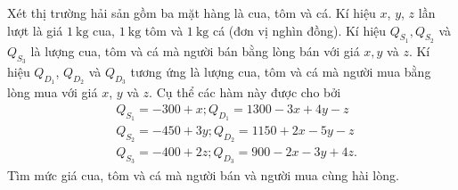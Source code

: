 \begin{bt}%
 Xét thị trường hải sản gồm ba mặt hàng là cua, tôm và cá. Kí hiệu $x$, $y$, $z$ lần lượt là giá $1 \mathrm{~kg}$ cua, $1 \mathrm{~kg}$ tôm và $1 \mathrm{~kg}$ cá (đơn vị nghìn đồng). Kí hiệu $Q_{S_1}, Q_{S_2}$ và $Q_{S_3}$ là lượng cua, tôm và cá mà người bán bằng lòng bán với giá $x, y$ và $z$. Kí hiệu $Q_{D_1}$, $Q_{D_2}$ và $Q_{D_3}$ tương ứng là lượng cua, tôm và cá mà người mua bằng lòng mua với giá $x$, $y$ và $z$. Cụ thể các hàm này được cho bởi
	$$
	\begin{aligned}
		&Q_{S_1}=-300+x ; Q_{D_1}=1300-3 x+4 y-z \\
		&Q_{S_2}=-450+3 y ; Q_{D_2}=1150+2 x-5 y-z \\
		&Q_{S_3}=-400+2 z ; Q_{D_3}=900-2 x-3 y+4 z.
	\end{aligned}
	$$
	Tìm mức giá cua, tôm và cá mà người bán và người mua cùng hài lòng.
	\end{bt}